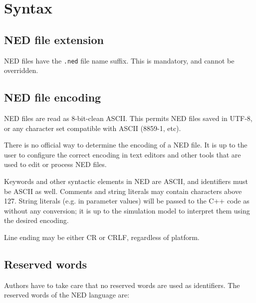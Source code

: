 \label{cha:ned-ref}

\section{Syntax}

\subsection{NED file extension}

NED files have the \texttt{.ned} file name suffix. This is mandatory, and
cannot be overridden.

\subsection{NED file encoding}

NED files are read as 8-bit-clean ASCII. This permits NED files saved
in UTF-8, or any character set compatible with ASCII (8859-1, etc).

\begin{note}
    There is no official way to determine the encoding of a NED file. It is up
    to the user to configure the correct encoding in text editors and other
    tools that are used to edit or process NED files.
\end{note}

Keywords and other syntactic elements in NED are ASCII, and identifiers must be
ASCII as well. Comments and string literals may contain characters above
127. String literals (e.g. in parameter values) will be passed to the C++ code
as  without any conversion; it is up to the simulation model
to interpret them using the desired encoding.

Line ending may be either CR or CRLF, regardless of platform.


\subsection{Reserved words}

Authors have to take care that no reserved words are used as identifiers.
The reserved words of the NED language are:



